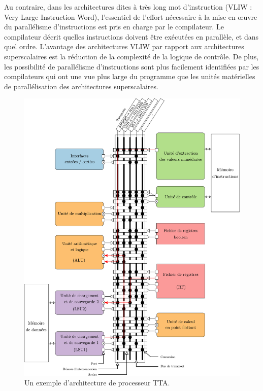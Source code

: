 Au contraire, dans les architectures dites \og à très long mot d'instruction \fg (VLIW : Very Large Instruction Word), l'essentiel de l'effort nécessaire à la mise en œuvre du parallélisme d'instructions est pris en charge par le compilateur. Le compilateur décrit quelles instructions doivent être exécutées en parallèle, et dans quel ordre. L'avantage des architectures VLIW par rapport aux architectures superscalaires est la réduction de la complexité de la logique de contrôle. De plus, les possibilité de parallélisme d'instructions sont plus facilement identifiées par les compilateurs qui ont une vue plus large du programme que les unités matérielles de parallélisation des architectures superscalaires.


\begin{figure}[htp]
\centering
\includegraphics[width=\textwidth]{main/ch4_fig/archi_tta}
\caption{Un exemple d'architecture de processeur TTA.}
\label{fig:tta_example}
\end{figure}

